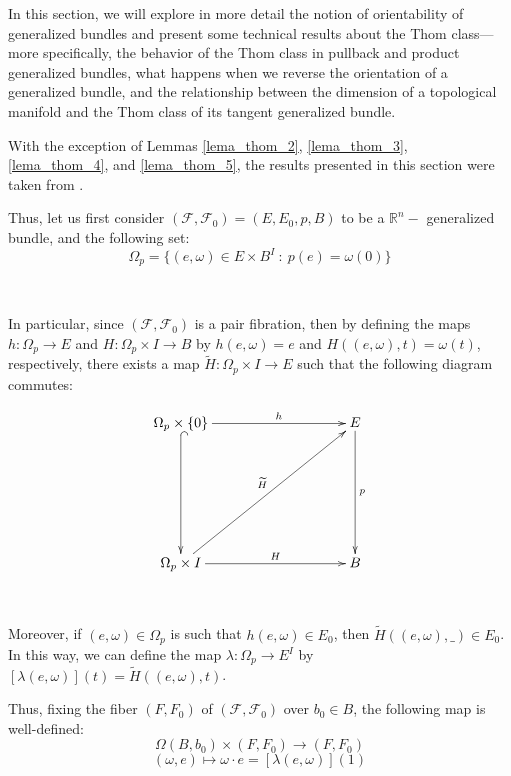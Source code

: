 \documentclass[12pt,oneside]{book}
\newcommand{\R}{\mathbb{R}}
\newcommand{\wt}{\widetilde}
\begin{document}
    In this section, we will explore in more detail the notion of orientability of generalized bundles and present some technical results 
    about the Thom class—more specifically, the behavior of the Thom class in pullback and 
    product generalized bundles, what happens when we reverse the orientation of a generalized bundle, and 
    the relationship between the dimension of a topological manifold and the Thom class of its tangent generalized 
    bundle.

    With the exception of Lemmas \ref{lema_thom_2}, \ref{lema_thom_3}, \ref{lema_thom_4}, and \ref{lema_thom_5}, the results presented in 
    this section were taken from \cite{fadell_1}.

    Thus, let us first consider $(\mathcal{F},\mathcal{F}_{0})=(E,E_{0},p,B)$ to be a $\R^{n}-$ generalized bundle, 
    and the following set:
    $$ \Omega_{p}=\{ (e,\omega)\in E\times B^{I} \ : \ p(e)=\omega(0) \} $$

    \

    In particular, since $(\mathcal{F},\mathcal{F}_{0})$ is a pair fibration, then by defining the maps 
    $h:\Omega_{p}\to E$ and $H:\Omega_{p}\times I\to B$ by $h(e,\omega)=e$ and $H((e,\omega),t)=\omega(t)$, respectively, there exists a 
    map $\wt{H}:\Omega_{p}\times I\to E$ such that the following diagram commutes:

    $$ \xymatrix @C=0.5cm {
    	\Omega_{p}\times \{0\}\ar[rrrrr]^-{h} \ar@{^(->}[ddd] &&&&& E \ar[ddd]^-{p} \\
    	&&&&& \\		 
    	&&&&& \\				 
    	\Omega_{p}\times I \ar[rrrrr]^-{H} \ar[rrrrruuu]^-{\wt{H}} &&&&& B
    } $$

    \

    Moreover, if $(e,\omega)\in \Omega_{p}$ is such that $h(e,\omega)\in E_{0}$, then $\wt{H}((e,\omega),\_) \in E_{0}$. 
    In this way, we can define the map $\lambda:\Omega_{p}\to E^{I}$ by $\left[ \lambda(e,\omega) \right](t)=\wt{H}((e,\omega),t)$.

    Thus, fixing the fiber $(F,F_{0})$ of $(\mathcal{F},\mathcal{F}_{0})$ over $b_{0}\in B$, the following map is well-defined:
    $$ \Omega(B,b_{0})\times (F,F_{0}) \to (F,F_{0}) $$
    $$ (\omega,e)\longmapsto \omega\cdot e=\left[ \lambda(e,\omega) \right](1)  $$
\end{document}
